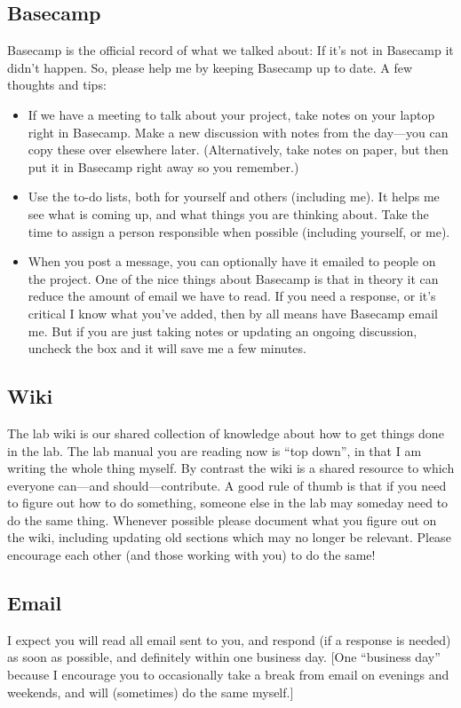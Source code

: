 \documentclass[letterpaper,12pt,oneside]{memoir}
\begin{document}
\subsection{Basecamp}
Basecamp is the official record of what we talked about: If it's not in Basecamp it didn't happen. So, please help me by keeping Basecamp up to date. A few thoughts and tips:

\begin{itemize}
\item If we have a meeting to talk about your project, take notes on your laptop right in Basecamp. Make a new discussion with notes from the day---you can copy these over elsewhere later. (Alternatively, take notes on paper, but then put it in Basecamp right away so you remember.)

\item Use the to-do lists, both for yourself and others (including me). It helps me see what is coming up, and what things you are thinking about. Take the time to assign a person responsible when possible (including yourself, or me).

\item When you post a message, you can optionally have it emailed to people on the project. One of the nice things about Basecamp is that in theory it can reduce the amount of email we have to read. If you need a response, or it's critical I know what you've added, then by all means have Basecamp email me. But if you are just taking notes or updating an ongoing discussion, uncheck the box and it will save me a few minutes.
\end{itemize}

\subsection{Wiki}

The lab wiki is our shared collection of knowledge about how to get things done in the lab. The lab manual you are reading now is ``top down'', in that I am writing the whole thing myself. By contrast the wiki is a shared resource to which everyone can---and should---contribute. A good rule of thumb is that if you need to figure out how to do something, someone else in the lab may someday need to do the same thing. Whenever possible please document what you figure out on the wiki, including updating old sections which may no longer be relevant. Please encourage each other (and those working with you) to do the same!


\subsection{Email}
I expect you will read all email sent to you, and respond (if a response is needed) as soon as possible, and definitely within one business day. [One ``business day'' because I encourage you to occasionally take a break from email on evenings and weekends, and will (sometimes) do the same myself.]
\end{document}
